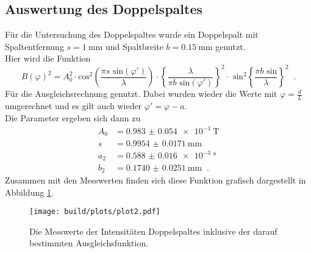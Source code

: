   \subsection{Auswertung des Doppelspaltes}
  \noindent Für die Untersuchung des Doppelspaltes wurde ein Doppelspalt mit Spaltentfernung $s =\SI{1}{\milli\metre}$ und Spaltbreite $b={\SI{0.15}{\milli\metre}}$ genutzt.\\
  Hier wird die Funktion 
  \begin{equation}
    B(\varphi)^2 = A_0^2 \cdot \text{cos}^2 \left( \frac{\pi s \text{ sin}(\varphi')}{\lambda} \right) \cdot 
    \left\{ \frac{\lambda}{\pi b \text{ sin}(\varphi')} \right\}^2 \cdot \text{ sin}^2 \left\{ \frac{ \pi b \text{ sin}}{\lambda} \right\}^2 \; \;.
  \end{equation}
  Für die Ausgleichsrechnung genutzt. Dabei wurden wieder die Werte mit $\varphi=\frac{d}{L}$ umgerechnet und es gilt auch wieder $\varphi'=\varphi-a$.\\
  Die Parameter ergeben sich dann zu
  \begin{align*}
    A_0&=\SI{0.983(0054)e-3}{\tesla}\\
    s&=\SI{0.9954(00171)}{\milli\metre}\\
    a_2&=\SI{0.588(0016)e-3}{\degree}\\
    b_2&=\SI{0.1740(00251)}{\milli\metre}\; \; .
  \end{align*}
  \noindent Zusammen mit den Messwerten finden sich diese Funktion grafisch dargestellt in Abbildung \ref{fig:plot2}.

  \begin{figure}[ht]
    \centering
    \texttt{[image: build/plots/plot2.pdf]}
    \caption{Die Messwerte der Intensitäten Doppelspaltes inklusive der darauf bestimmten Ausgleichsfunktion.}
    \label{fig:plot2}
  \end{figure}

